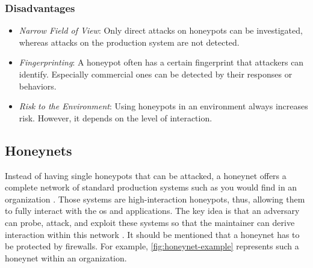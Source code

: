\subsubsection{Disadvantages}

\begin{itemize}
    \item \textit{Narrow Field of View}: Only direct attacks on honeypots can be investigated, whereas attacks on the production system are not detected.
    \item \textit{Fingerprinting}: A honeypot often has a certain fingerprint that attackers can identify.
          Especially commercial ones can be detected by their responses or behaviors.
    \item \textit{Risk to the Environment}: Using honeypots in an environment always increases risk.
          However, it depends on the level of interaction.
\end{itemize}

\subsection{Honeynets}

Instead of having single honeypots that can be attacked, a honeynet offers a complete network of standard production systems such as you would find in an organization \cite{sokol2017}.
Those systems are high-interaction honeypots, thus, allowing them to fully interact with the \ac{os} and applications.
The key idea is that an adversary can probe, attack, and exploit these systems so that the maintainer can derive interaction within this network \cite{Spitzner2003,sokol2017}.
It should be mentioned that a honeynet has to be protected by firewalls.
For example, \autoref{fig:honeynet-example} represents such a honeynet within an organization.

